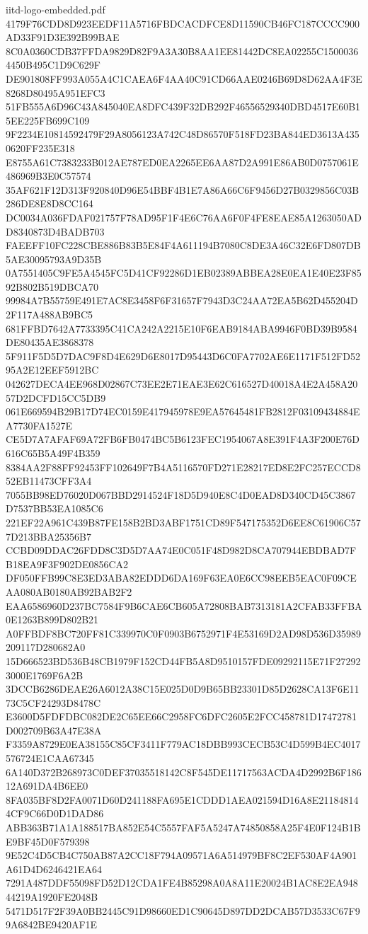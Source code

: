\begin{filecontents*}[overwrite]{iitd-logo-embedded.pdf}
4179F76CDD8D923EEDF11A5716FBDCACDFCE8D11590CB46FC187CCCC900AD33F91D3E392B99BAE
8C0A0360CDB37FFDA9829D82F9A3A30B8AA1EE81442DC8EA02255C15000364450B495C1D9C629F
DE901808FF993A055A4C1CAEA6F4AA40C91CD66AAE0246B69D8D62AA4F3E8268D80495A951EFC3
51FB555A6D96C43A845040EA8DFC439F32DB292F46556529340DBD4517E60B15EE225FB699C109
9F2234E10814592479F29A8056123A742C48D86570F518FD23BA844ED3613A4350620FF235E318
E8755A61C7383233B012AE787ED0EA2265EE6AA87D2A991E86AB0D0757061E486969B3E0C57574
35AF621F12D313F920840D96E54BBF4B1E7A86A66C6F9456D27B0329856C03B286DE8E8D8CC164
DC0034A036FDAF021757F78AD95F1F4E6C76AA6F0F4FE8EAE85A1263050ADD8340873D4BADB703
FAEEFF10FC228CBE886B83B5E84F4A611194B7080C8DE3A46C32E6FD807DB5AE30095793A9D35B
0A7551405C9FE5A4545FC5D41CF92286D1EB02389ABBEA28E0EA1E40E23F8592B802B519DBCA70
99984A7B55759E491E7AC8E3458F6F31657F7943D3C24AA72EA5B62D455204D2F117A488AB9BC5
681FFBD7642A7733395C41CA242A2215E10F6EAB9184ABA9946F0BD39B9584DE80435AE3868378
5F911F5D5D7DAC9F8D4E629D6E8017D95443D6C0FA7702AE6E1171F512FD5295A2E12EEF5912BC
042627DECA4EE968D02867C73EE2E71EAE3E62C616527D40018A4E2A458A2057D2DCFD15CC5DB9
061E669594B29B17D74EC0159E417945978E9EA57645481FB2812F03109434884EA7730FA1527E
CE5D7A7AFAF69A72FB6FB0474BC5B6123FEC1954067A8E391F4A3F200E76D616C65B5A49F4B359
8384AA2F88FF92453FF102649F7B4A5116570FD271E28217ED8E2FC257ECCD852EB11473CFF3A4
7055BB98ED76020D067BBD2914524F18D5D940E8C4D0EAD8D340CD45C3867D7537BB53EA1085C6
221EF22A961C439B87FE158B2BD3ABF1751CD89F547175352D6EE8C61906C577D213BBA25356B7
CCBD09DDAC26FDD8C3D5D7AA74E0C051F48D982D8CA707944EBDBAD7FB18EA9F3F902DE0856CA2
DF050FFB99C8E3ED3ABA82EDDD6DA169F63EA0E6CC98EEB5EAC0F09CEAA080AB0180AB92BAB2F2
EAA6586960D237BC7584F9B6CAE6CB605A72808BAB7313181A2CFAB33FFBA0E1263B899D802B21
A0FFBDF8BC720FF81C339970C0F0903B6752971F4E53169D2AD98D536D35989209117D280682A0
15D666523BD536B48CB1979F152CD44FB5A8D9510157FDE09292115E71F272923000E1769F6A2B
3DCCB6286DEAE26A6012A38C15E025D0D9B65BB23301D85D2628CA13F6E1173C5CF24293D8478C
E3600D5FDFDBC082DE2C65EE66C2958FC6DFC2605E2FCC458781D17472781D002709B63A47E38A
F3359A8729E0EA38155C85CF3411F779AC18DBB993CECB53C4D599B4EC4017576724E1CAA67345
6A140D372B268973C0DEF37035518142C8F545DE11717563ACDA4D2992B6F18612A691DA4B6EE0
8FA035BF8D2FA0071D60D241188FA695E1CDDD1AEA021594D16A8E211848144CF9C66D0D1DAD86
ABB363B71A1A188517BA852E54C5557FAF5A5247A74850858A25F4E0F124B1BE9BF45D0F579398
9E52C4D5CB4C750AB87A2CC18F794A09571A6A514979BF8C2EF530AF4A901A61D4D6246421EA64
7291A487DDF55098FD52D12CDA1FE4B85298A0A8A11E20024B1AC8E2EA94844219A1920FE2048B
5471D517F2F39A0BB2445C91D98660ED1C90645D897DD2DCAB57D3533C67F99A6842BE9420AF1E

\end{filecontents*}
